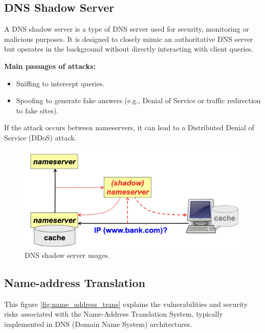 \clearpage

\subsection*{DNS Shadow Server}
A DNS shadow server is a type of DNS server used for security, monitoring or malicious purposes. It is designed to closely mimic an authoritative DNS server but operates in the background without directly interacting with client queries.

\hfill


\textbf{Main passages of attacks:}
\begin{itemize}
    \item Sniffing to intercept queries.
    \item Spoofing to generate fake answers (e.g., Denial of Service or traffic redirection to fake sites).
\end{itemize}

If the attack occurs between nameservers, it can lead to a Distributed Denial of Service (DDoS) attack.
\begin{figure}[H]
    \centering
  \includegraphics[width=0.6\linewidth]{Images/NetSec/dns_shadow_server.png}
  \caption{DNS shadow server usages.}
\end{figure}

\subsection{Name-address Translation}
This figure \ref{fig:name_address_trans} explains the vulnerabilities and security risks associated with the Name-Address Translation System, typically implemented in DNS (Domain Name System) architectures.

